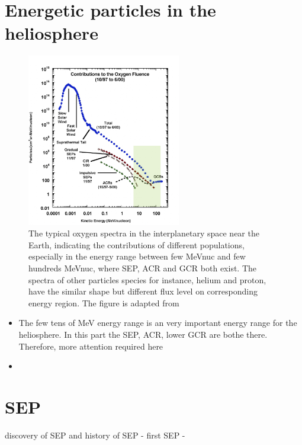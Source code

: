 \section{Energetic particles in the heliosphere}
\label{sec:particles_heliosphere}
\begin{figure}
	\centering
	\includegraphics[width = 0.6\textwidth]{images/heliospheric_particle_spectra_color.png}
	\caption[Energy spectra of oxygen ions in the near Earth space]{The typical oxygen spectra in the interplanetary space near the Earth, indicating the contributions of different populations, especially in the energy range between few MeV\/nuc and few hundreds MeV\/nuc, where \acs{SEP}, \acs{ACR} and \acs{GCR} both exist. The spectra of other particles species for instance, helium and proton, have the similar shape but different flux level on corresponding energy region. The figure is adapted from \cite{Mewaldt-2001}}
	\label{Fig:Oxygen_spectra_heliosphere}
\end{figure}

\begin{itemize}
	\item The few tens of MeV energy range is an very important energy range for the heliosphere. In this part the SEP, ACR, lower GCR are bothe there. Therefore, more attention required here
	\item 
\end{itemize}



\section{SEP}

discovery of SEP and history of SEP
- first SEP
- 

